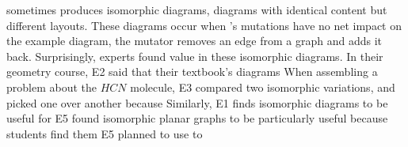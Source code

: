 



\Edgeworth sometimes produces isomorphic diagrams, \ie diagrams with identical content but different layouts. These diagrams occur when \Edgeworth's mutations have no net impact on the example diagram, \eg the mutator removes an edge from a graph and adds it back. Surprisingly, experts found value in these isomorphic diagrams. 
In their geometry course, E2 said that their textbook's diagrams  When assembling a problem about the $HCN$ molecule, E3 compared two isomorphic variations, and picked one over another because   Similarly, E1 finds isomorphic diagrams to be useful for  
E5 found isomorphic planar graphs to be particularly useful because students find them  E5 planned to use \Edgeworth to 



